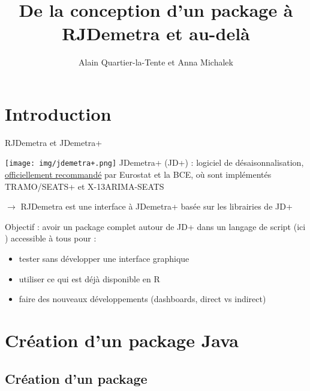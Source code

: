 \documentclass[10pt,xcolor=table,color={dvipsnames,usenames},ignorenonframetext,usepdftitle=false,french]{beamer}
\title{De la conception d'un package à RJDemetra et au-delà}
\author{Alain Quartier-la-Tente et Anna Michalek}
\date{}
\begin{document}
\begin{frame}
\titlepage
\end{frame}

\hypertarget{introduction}{%
\section{Introduction}\label{introduction}}

\begin{frame}{RJDemetra et JDemetra+ \bcquestion}
\protect\hypertarget{rjdemetra-et-jdemetra}{}

\texttt{[image: img/jdemetra+.png]} JDemetra+ (JD+) :
logiciel de désaisonnalisation,
\href{https://ec.europa.eu/eurostat/cros/system/files/Jdemetra_\%20release.pdf}{officiellement
recommandé} par Eurostat et la BCE, où sont implémentés TRAMO/SEATS+ et
X-13ARIMA-SEATS

\bigskip

\(\rightarrow\) RJDemetra est une interface \large\faRProject{}
\normalsize à JDemetra+ basée sur les librairies \large\faJava{}
\normalsize de JD+

\pause

Objectif : avoir un package complet autour de JD+ dans un langage de
script (ici \faRProject) accessible à tous pour :

\begin{itemize}
\item
  tester sans développer une interface graphique
\item
  utiliser ce qui est déjà disponible en R
\item
  faire des nouveaux développements (dashboards, direct vs indirect)
\end{itemize}

\end{frame}

\hypertarget{creation-dun-package-java}{%
\section{Création d'un package Java}\label{creation-dun-package-java}}

\hypertarget{creation-dun-package}{%
\subsection{Création d'un package}\label{creation-dun-package}}
\end{document}
